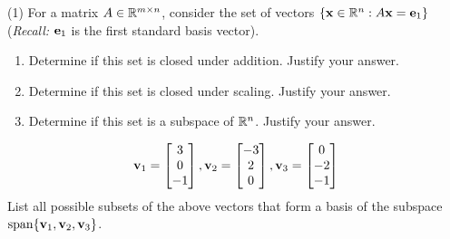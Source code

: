 \begin{tasks}[resume, style=enumerate](1)
\task
  For a matrix $A \in \mathbb R^{m \times n}$, consider the set of vectors
  $\{\mathbf x \in \mathbb R^n : A\mathbf x= \mathbf e_1\}$ (\textit{Recall:} $\mathbf e_1$ is the
  first standard basis vector).
  \begin{enumerate}[label=(\alph*)]
  \item
    Determine if this set is closed under addition. Justify your
    answer.
  \item
    Determine if this set is closed under scaling. Justify your
    answer.
  \item
    Determine if this set is a subspace of $\mathbb R^n$. Justify your
    answer.
  \end{enumerate}
\task
  \begin{align*}
    \mathbf v_1 = \begin{bmatrix}
      3  \\
      0  \\
      -1
    \end{bmatrix},
    \mathbf v_2 = \begin{bmatrix}
      -3  \\
      2  \\
      0
    \end{bmatrix},
    \mathbf v_3 = \begin{bmatrix}
      0  \\
      -2  \\
      -1
    \end{bmatrix}
\end{align*}
List all possible subsets of the above vectors that form a basis of
the subspace $\operatorname{\mathrm{span}}\{\mathbf v_1, \mathbf v_2, \mathbf v_3\}$.\footnotemark
\end{tasks}
